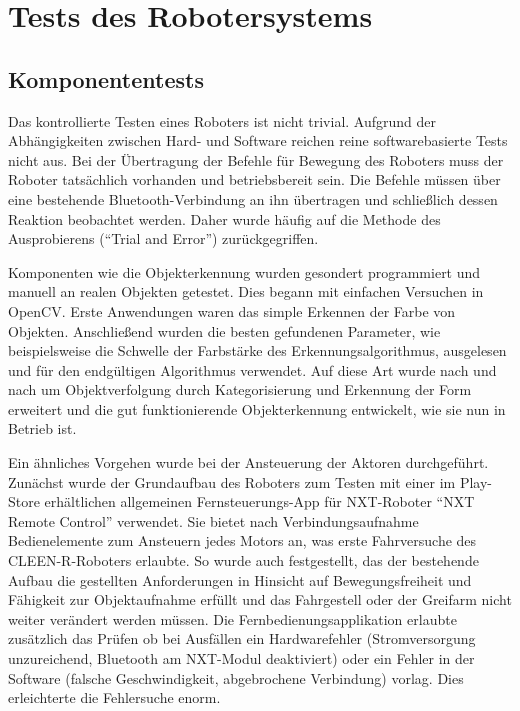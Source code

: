 \chapter{Tests des Robotersystems}
\label{cha:Tests}

\section{Komponententests}

Das kontrollierte Testen eines Roboters ist nicht trivial. Aufgrund der Abhängigkeiten zwischen Hard- und Software reichen reine softwarebasierte Tests nicht aus. Bei der Übertragung der Befehle für Bewegung des Roboters  muss der Roboter tatsächlich vorhanden und betriebsbereit sein. Die Befehle müssen über eine bestehende Bluetooth-Verbindung an ihn übertragen und schließlich dessen Reaktion beobachtet werden. Daher wurde häufig auf die Methode des Ausprobierens (\enquote{Trial and Error}) zurückgegriffen. 

Komponenten wie die Objekterkennung wurden gesondert programmiert und manuell an realen Objekten getestet. Dies begann mit einfachen Versuchen in OpenCV. Erste Anwendungen waren das simple Erkennen der Farbe von Objekten. Anschließend wurden die besten gefundenen Parameter, wie beispielsweise  die Schwelle der Farbstärke des Erkennungsalgorithmus, ausgelesen und für den endgültigen Algorithmus verwendet. Auf diese Art wurde nach und nach um Objektverfolgung durch Kategorisierung und Erkennung der Form erweitert und die gut funktionierende Objekterkennung entwickelt, wie sie nun in Betrieb ist.

Ein ähnliches Vorgehen wurde bei der Ansteuerung der Aktoren durchgeführt. Zunächst wurde der Grundaufbau des Roboters zum Testen mit einer im Play-Store erhältlichen allgemeinen Fernsteuerungs-App für NXT-Roboter \enquote{NXT Remote Control} \cite{nxt_remote_control} verwendet. Sie bietet nach Verbindungsaufnahme Bedienelemente zum Ansteuern jedes Motors an, was erste Fahrversuche des CLEEN-R-Roboters erlaubte. So wurde auch festgestellt, das der bestehende Aufbau die gestellten Anforderungen in Hinsicht auf Bewegungsfreiheit und Fähigkeit zur Objektaufnahme erfüllt und das Fahrgestell oder der Greifarm nicht weiter verändert werden müssen. Die Fernbedienungsapplikation erlaubte zusätzlich das Prüfen ob bei Ausfällen ein Hardwarefehler (Stromversorgung unzureichend, Bluetooth am NXT-Modul deaktiviert) oder ein Fehler in der Software (falsche Geschwindigkeit, abgebrochene Verbindung) vorlag. Dies erleichterte die Fehlersuche enorm.

